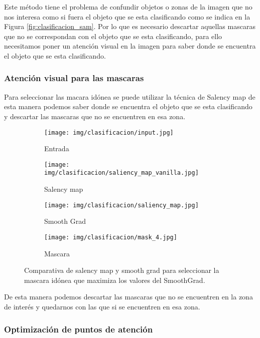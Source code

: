 \documentclass[10pt,a4paper,twocolumn,twoside]{article}
\begin{document}
Este método tiene el problema de confundir objetos o zonas de la imagen que no nos interesa como si fuera el objeto que se esta clasificando como se indica en la Figura \ref{fig:clasificacion_sam}. Por lo que es necesario descartar aquellas mascaras que no se correspondan con el objeto que se esta clasificando, para ello
necesitamos poner un atención visual en la imagen para saber donde se encuentra el objeto que se esta clasificando.

\subsubsection{Atención visual para las mascaras}

Para seleccionar las macara idónea se puede utilizar la técnica de Salency map de esta manera podemos saber donde se encuentra el objeto que se esta clasificando y descartar las mascaras que no se encuentren en esa zona.

\begin{figure}[h!]
  \centering
  \begin{subfigure}[b]{0.115\textwidth}
    \texttt{[image: img/clasificacion/input.jpg]}
    \caption{Entrada}
  \end{subfigure}
  \begin{subfigure}[b]{0.115\textwidth}
    \texttt{[image: img/clasificacion/saliency\_map\_vanilla.jpg]}
    \caption{Salency map}
  \end{subfigure}
  \begin{subfigure}[b]{0.115\textwidth}
    \texttt{[image: img/clasificacion/saliency\_map.jpg]}
    \caption{Smooth Grad}
  \end{subfigure}
  \begin{subfigure}[b]{0.115\textwidth}
    \texttt{[image: img/clasificacion/mask\_4.jpg]}
    \caption{Mascara}
  \end{subfigure}
  \caption{Comparativa de salency map y smooth grad para seleccionar la mascara idónea que maximiza los valores del SmoothGrad.}
\end{figure}

De esta manera podemos descartar las mascaras que no se encuentren en la zona de interés y quedarnos con las que si se encuentren en esa zona.

\subsubsection{Optimización de puntos de atención}
\end{document}
